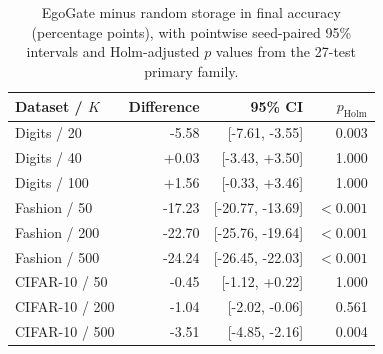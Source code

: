 \begin{table}[t]\centering\small
\caption{EgoGate minus random storage in final accuracy (percentage points), with pointwise seed-paired 95\% intervals and Holm-adjusted $p$ values from the 27-test primary family.}
\label{tab:offlinecontrasts}
\begin{tabular}{lrrr}\toprule
Dataset / $K$ & Difference & 95\% CI & $p_{\mathrm{Holm}}$\\\midrule
Digits / 20 & -5.58 & [-7.61, -3.55] & 0.003 \\
Digits / 40 & +0.03 & [-3.43, +3.50] & 1.000 \\
Digits / 100 & +1.56 & [-0.33, +3.46] & 1.000 \\
Fashion / 50 & -17.23 & [-20.77, -13.69] & $<0.001$ \\
Fashion / 200 & -22.70 & [-25.76, -19.64] & $<0.001$ \\
Fashion / 500 & -24.24 & [-26.45, -22.03] & $<0.001$ \\
CIFAR-10 / 50 & -0.45 & [-1.12, +0.22] & 1.000 \\
CIFAR-10 / 200 & -1.04 & [-2.02, -0.06] & 0.561 \\
CIFAR-10 / 500 & -3.51 & [-4.85, -2.16] & 0.004 \\
\bottomrule\end{tabular}
\end{table}
